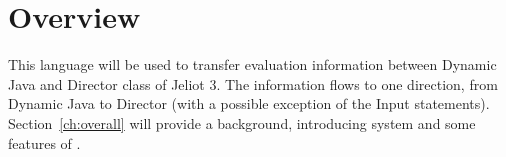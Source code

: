 \section{Overview}
\label{sec:overview}

This language will be used to transfer evaluation information between Dynamic Java and Director class of Jeliot 3. The information flows to one direction, from Dynamic Java to Director (with a possible exception of the Input statements).
Section~\ref{ch:overall} will provide a background, introducing \jel{} system and some features of \mcode{}.
